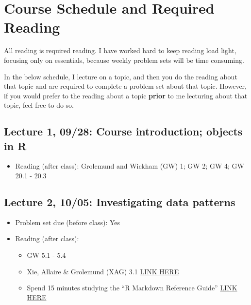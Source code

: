 \documentclass[11pt,]{article}
\providecommand{\tightlist}{%
  \setlength{\itemsep}{0pt}\setlength{\parskip}{0pt}}
\begin{document}
\section{Course Schedule and Required
Reading}\label{course-schedule-and-required-reading}

All reading is required reading. I have worked hard to keep reading load
light, focusing only on essentials, because weekly problem sets will be
time consuming.

In the below schedule, I lecture on a topic, and then you do the reading
about that topic and are required to complete a problem set about that
topic. However, if you would prefer to the reading about a topic
\textbf{prior} to me lecturing about that topic, feel free to do so.

\subsection{Lecture 1, 09/28: Course introduction; objects in
R}\label{lecture-1-0928-course-introduction-objects-in-r}

\begin{itemize}
\tightlist
\item
  Reading (after class): Grolemund and Wickham (GW) 1; GW 2; GW 4; GW
  20.1 - 20.3
\end{itemize}

\subsection{Lecture 2, 10/05: Investigating data
patterns}\label{lecture-2-1005-investigating-data-patterns}

\begin{itemize}
\tightlist
\item
  Problem set due (before class): Yes
\item
  Reading (after class):

  \begin{itemize}
  \tightlist
  \item
    GW 5.1 - 5.4
  \item
    Xie, Allaire \& Grolemund (XAG) 3.1
    \href{https://bookdown.org/yihui/rmarkdown/html-document.html}{LINK
    HERE}
  \item
    Spend 15 minutes studying the ``R Markdown Reference Guide''
    \href{https://www.rstudio.com/wp-content/uploads/2015/03/rmarkdown-reference.pdf}{LINK
    HERE}
  \end{itemize}
\end{itemize}
\end{document}
